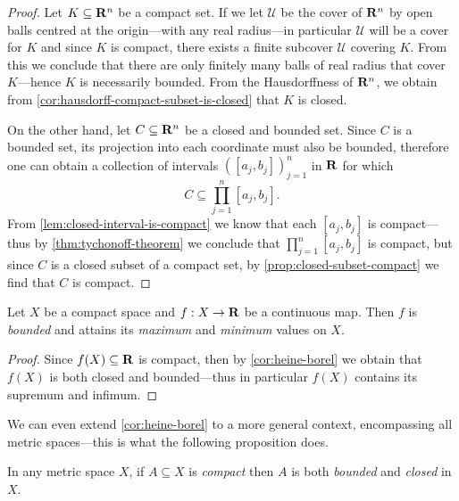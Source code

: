 \begin{proof}
Let \(K \subseteq \mathbf{R}^n\) be a compact set. If we let \(\mathcal{U}\) be the
cover of \(\mathbf{R}^n\) by open balls centred at the origin---with any real
radius---in particular \(\mathcal{U}\) will be a cover for \(K\) and since \(K\)
is compact, there exists a finite subcover \(\mathcal{U}\) covering \(K\). From
this we conclude that there are only finitely many balls of real radius that
cover \(K\)---hence \(K\) is necessarily bounded. From the Hausdorffness of
\(\mathbf{R}^n\), we obtain from \cref{cor:hausdorff-compact-subset-is-closed} that
\(K\) is closed.

On the other hand, let \(C \subseteq \mathbf{R}^n\) be a closed and bounded set. Since
\(C\) is a bounded set, its projection into each coordinate must also be
bounded, therefore one can obtain a collection of intervals
\(([a_j, b_j])_{j=1}^n\) in \(\mathbf{R}\) for which
\[
C \subseteq \prod_{j=1}^n [a_j, b_j].
\]
From \cref{lem:closed-interval-is-compact} we know that each \([a_j, b_j]\) is
compact---thus by \cref{thm:tychonoff-theorem} we conclude that
\(\prod_{j=1}^n [a_j, b_j]\) is compact, but since \(C\) is a closed subset of a
compact set, by \cref{prop:closed-subset-compact} we find that \(C\) is compact.
\end{proof}

\begin{corollary}
\label{cor:extreme-values-on-compact-sets}
Let \(X\) be a compact space and \(f: X \to \mathbf{R}\) be a continuous map. Then \(f\)
is \emph{bounded} and attains its \emph{maximum} and \emph{minimum} values on
\(X\).
\end{corollary}

\begin{proof}
Since \(f(X) \subseteq \mathbf{R}\) is compact, then by \cref{cor:heine-borel} we obtain
that \(f(X)\) is both closed and bounded---thus in particular \(f(X)\)
contains its supremum and infimum.
\end{proof}

We can even extend \cref{cor:heine-borel} to a more general context,
encompassing all metric spaces---this is what the following proposition does.

\begin{proposition}
\label{prop:metric-space-compact-implies-bounded-closed}
In any metric space \(X\), if \(A \subseteq X\) is \emph{compact} then \(A\) is
both \emph{bounded} and \emph{closed} in \(X\).
\end{proposition}

